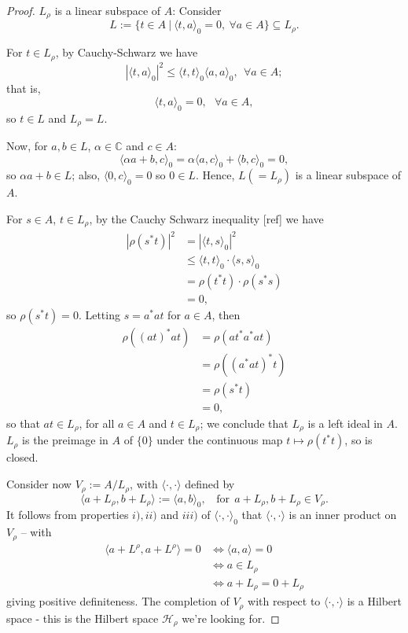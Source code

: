 \documentclass[12pt,a4paper]{amsart}
\theoremstyle{plain}
\theoremstyle{definition}
\newcommand{\Hr}{\mathcal{H}_\rho}
\newcommand{\1}{\mathbbm{1}}
\begin{document}
\begin{proof}
	$L_\rho$ is  a linear subspace of $A$: Consider  %
	\[
		L:= \{t \in A  ~|~ \langle t,a \rangle _0 = 0, ~\forall a \in A \}\subseteq L_\rho.
	\]
	
	For $t \in L_\rho$, by Cauchy-Schwarz we have 
	\[ 
		|\langle t,a \rangle_0|^2 \leq \langle t,t \rangle_0 \langle a,a\rangle_0,~~ \forall a \in A;
	\]
	that is,
	\[
		\langle t,a \rangle _0 = 0, ~~~ \forall a \in A,
	\]
	so $t\in L$ and $L_\rho =L$.
	
	Now, for $a,b \in L$, $\alpha \in \mathbb{C}$ and $c \in A$:
	\[
		\langle \alpha a + b, c \rangle _0 = \alpha \langle a,c \rangle _0 + \langle b,c\rangle _0 = 0,
	\]
	so $\alpha a +b \in L$; also, $\langle 0,c\rangle _0 = 0$ so $0 \in L$. 
	Hence, $L ( =L_\rho ) $ is a linear subspace of $A$.
	
	For $s \in A$, $t\in L_\rho$, by the Cauchy Schwarz inequality [ref] we have 
	\begin{align*}
		|\rho (s^\ast t) |^2 
		&= 		|\langle t,s\rangle_0 |^2 									\\
		&\leq 	\langle t,t\rangle_0 \cdot \langle s,s\rangle_0  			\\
		&= 		\rho (t^\ast t) \cdot \rho (s^\ast s)						\\
		&=		0,
	\end{align*}
	so $\rho (s^\ast t) = 0$. Letting $s = a^\ast a t$ for $a \in A$, then
	\begin{align*}
		\rho ((at)^\ast at) 
		&= 		\rho (at^\ast a^\ast at) 									\\
		&= 		\rho ((a^\ast at)^\ast t) 									\\
		&= 		\rho (s^\ast t) 											\\
		&=		0,
	\end{align*}
	so that $at \in L_\rho$, for all $a \in A$ and $t \in L_\rho$; 
	we conclude that $L_\rho$ is a left ideal in $A$.
	$L_\rho$ is  the preimage in $A$ of $\{0\}$ under the continuous map%
	$t \mapsto \rho (t^\ast t)$, so is closed.
	
	Consider now $V_\rho := A / L_\rho$, with $\langle \cdot,\cdot\rangle$ defined by 
	\[
		\langle a+L_\rho,b+L_\rho \rangle := \langle a,b\rangle_0, ~~~~ 
		\mbox{for}~~a+L_\rho,b+L_\rho \in V_\rho.
	\]
	It follows from properties $i),ii)$ and $iii)$ of $\langle \cdot,\cdot  \rangle _0$ that
	$\langle \cdot,\cdot  \rangle$ is an inner product on $V_\rho$ -- with
	\begin{align*}
				\langle a + L^\rho, a + L^\rho \rangle = 0
		&\iff 	\langle a,a\rangle=0										\\
		&\iff 	a \in L_\rho												\\
		&\iff 	a+L_\rho = 0+L_\rho
	\end{align*}
	giving positive definiteness.
	The completion of $V_\rho$ with respect to $\langle \cdot,\cdot  \rangle$ is a Hilbert space -
	this is the Hilbert space $\Hr$ we're looking for.
	

\end{proof}
\end{document}
